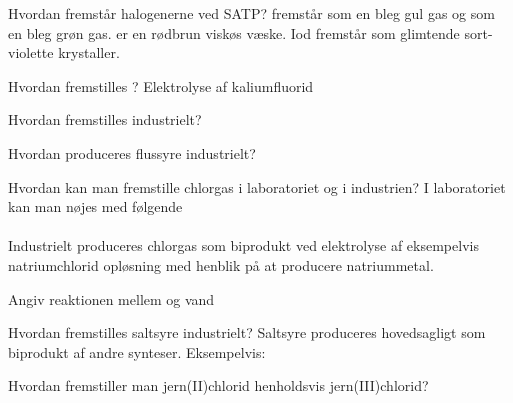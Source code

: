 
\begin{flashcard}[Egenskab]{Hvordan fremstår halogenerne ved SATP?}
 fremstår som en bleg gul gas og  som en bleg grøn gas.  er en rødbrun viskøs væske. Iod fremstår som glimtende sort-violette krystaller.
\end{flashcard}

\begin{flashcard}[Fremstilling]{Hvordan fremstilles ?}
Elektrolyse af kaliumfluorid
\end{flashcard}

\begin{flashcard}[Fremstilling]{Hvordan fremstilles  industrielt?}
\\
\end{flashcard}

\begin{flashcard}[Fremstilling]{Hvordan produceres flussyre industrielt?}
\end{flashcard}

\begin{flashcard}[Fremstilling]{Hvordan kan man fremstille chlorgas i laboratoriet og i industrien?}
I laboratoriet kan man nøjes med følgende\\
\\ \vspace{7pt}
Industrielt produceres chlorgas som biprodukt ved elektrolyse af eksempelvis natriumchlorid opløsning med henblik på at producere natriummetal.
\end{flashcard}

\begin{flashcard}[Reaktion]{Angiv reaktionen mellem  og vand}
\end{flashcard}

\begin{flashcard}[Fremstilling]{Hvordan fremstilles saltsyre industrielt?}
Saltsyre produceres hovedsagligt som biprodukt af andre synteser. Eksempelvis:\\
\end{flashcard}

\begin{flashcard}[Reaktion]{Hvordan fremstiller man jern(II)chlorid henholdsvis jern(III)chlorid?}
\\ \vspace{7pt}
\end{flashcard}

